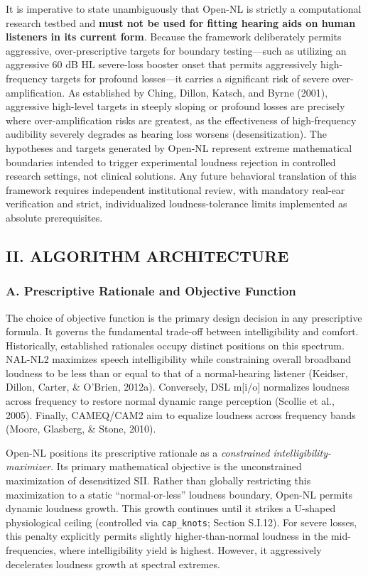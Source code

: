 \documentclass[
  12pt,
]{article}
\begin{document}
It is imperative to state unambiguously that Open-NL is strictly a
computational research testbed and \textbf{must not be used for fitting
hearing aids on human listeners in its current form}. Because the
framework deliberately permits aggressive, over-prescriptive targets for
boundary testing---such as utilizing an aggressive 60 dB HL severe-loss
booster onset that permits aggressively high-frequency targets for
profound losses---it carries a significant risk of severe
over-amplification. As established by Ching, Dillon, Katsch, and Byrne
(2001), aggressive high-level targets in steeply sloping or profound
losses are precisely where over-amplification risks are greatest, as the
effectiveness of high-frequency audibility severely degrades as hearing
loss worsens (desensitization). The hypotheses and targets generated by
Open-NL represent extreme mathematical boundaries intended to trigger
experimental loudness rejection in controlled research settings, not
clinical solutions. Any future behavioral translation of this framework
requires independent institutional review, with mandatory real-ear
verification and strict, individualized loudness-tolerance limits
implemented as absolute prerequisites.

\subsection{II. ALGORITHM
ARCHITECTURE}\label{ii.-algorithm-architecture}

\subsubsection{A. Prescriptive Rationale and Objective
Function}\label{a.-prescriptive-rationale-and-objective-function}

The choice of objective function is the primary design decision in any
prescriptive formula. It governs the fundamental trade-off between
intelligibility and comfort. Historically, established rationales occupy
distinct positions on this spectrum. NAL-NL2 maximizes speech
intelligibility while constraining overall broadband loudness to be less
than or equal to that of a normal-hearing listener (Keidser, Dillon,
Carter, \& O'Brien, 2012a). Conversely, DSL m{[}i/o{]} normalizes
loudness across frequency to restore normal dynamic range perception
(Scollie et al., 2005). Finally, CAMEQ/CAM2 aim to equalize loudness
across frequency bands (Moore, Glasberg, \& Stone, 2010).

Open-NL positions its prescriptive rationale as a \emph{constrained
intelligibility-maximizer}. Its primary mathematical objective is the
unconstrained maximization of desensitized SII. Rather than globally
restricting this maximization to a static ``normal-or-less'' loudness
boundary, Open-NL permits dynamic loudness growth. This growth continues
until it strikes a U-shaped physiological ceiling (controlled via
\texttt{cap\_knots}; Section S.I.12). For severe losses, this penalty
explicitly permits slightly higher-than-normal loudness in the
mid-frequencies, where intelligibility yield is highest. However, it
aggressively decelerates loudness growth at spectral extremes.
\end{document}
